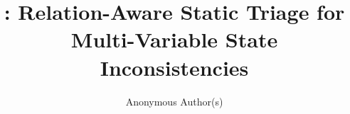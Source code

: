 \title{\texorpdfstring{\tool}{MV-SCAN}: Relation-Aware Static Triage for Multi-Variable State Inconsistencies}

\author{Anonymous Author(s)}



\renewcommand\footnotetextcopyrightpermission[1]{}
